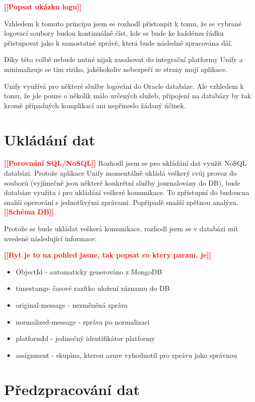 \documentclass[thesis=M,czech]{FITthesis}[2012/10/20]
\newcommand{\todo}[1]{\textcolor{red}{\textbf{[[#1]]}}}
\begin{document}
		\todo{Popsat ukázku logu}
		
		Vzhledem k tomuto principu jsem se rozhodl přistoupit k tomu, že se vybrané logovací soubory budou kontinuálně číst, kde se bude ke každému řádku přistupovat jako k samostatné zprávě, která bude následně zpracována dál.
		
		Díky této volbě nebude nutné nijak zasahovat do integrační platformy Unify a minimalizuje se tím riziko, jakéhokoliv nebezpečí ze strany mojí aplikace.
		
		Unify využívá pro některé služby logování do Oracle databáze. Ale vzhledem k tomu, že jde pouze o několik málo určených služeb, připojení na databázy by tak kromě případných komplikací ani nepřineslo žádaný účinek.
		
		
	\section{Ukládání dat}
		\label{sec:data_storing}
		\todo{Porovnání SQL/NoSQL}
		Rozhodl jsem se pro ukládání dat využít NoSQL databázi. Protože aplikace Unify momentálně ukládá veškerý svůj provoz do souborů (vyjímečně jsou některé konkrétní služby journalovány do DB), bude databáze využita i pro ukládání veškeré komunikace. To zpřístupní do budoucna snažší operování s jednotlivými zprávami. Popřípadě snažší zpětnou analýzu.
		\todo{Schéma DB}
		
		Protože se bude ukládat veškerá komunikace, rozhodl jsem se v databázi mít uvedené následující informace:
		
		\todo{Byt je to na pohled jasne, tak popsat co ktery param. je}
		\begin{itemize} 
			\item ObjectId - automaticky generováno z MongoDB
			\item timestamp- časové razítko uložení záznamu do DB
			\item original-message - nezměněná zpráva
			\item normalized-message - zpráva po normalizaci
			\item platformId - jedinečný identifikátor platformy
			\item assignment - skupina, kterou azure vyhodnotil pro zprávu jako správnou 		
		\end{itemize}
					
	\section{Předzpracování dat}
		\label{sec:preprocessing}
		
\end{document}
